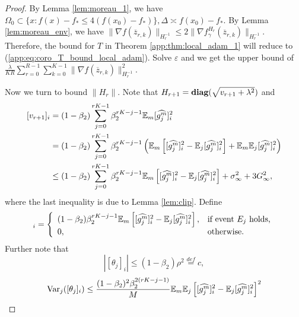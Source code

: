 \documentclass{article} %
\numberwithin{equation}{section}
\renewcommand{\eqref}[1]{(\ref{#1})}
\begin{document}
\begin{proof}
    By Lemma \ref{lem:moreau_1}, we have $\Omega_0\subset \{x: f(x)-f_*\leq 4(f(x_0)-f_*)\}, \Delta\asymp f(x_0)-f_*$.
    By Lemma \ref{lem:moreau_env}, we have $\|\nabla f(\overline{z}_{r,k})\|_{H_r^{-1}}\leq 2\|\nabla f_\gamma^{H_r}(\overline{z}_{r,k})\|_{H_r^{-1}}$. 
    Therefore, the bound for $T$ in Theorem \ref{app:thm:local_adam_1} will reduce to \eqref{app:eq:coro_T_bound_local_adam}. Solve $\varepsilon$ and we get the upper bound of $\frac{\lambda}{KR}\sum_{r=0}^{R-1}\sum_{k=0}^{K-1}\|\nabla f(\overline{z}_{r,k}) \|_{H_r^{-1}}^2$.

    Now we turn to bound $\|H_r\|$. Note that $H_{r+1}=\mbox{\bf diag}(\sqrt{v_{r+1}+\lambda^2})$ and 
    \begin{equation}
        \begin{aligned}
            \relax[v_{r+1}]_i
            &=(1-\beta_2)\sum_{j=0}^{rK-1}\beta_2^{rK-j-1}\mathbb{E}_m[\widehat{g_j^m}]_i^2 \\
            &= (1-\beta_2)\sum_{j=0}^{rK-1}\beta_2^{rK-j-1}\left(\mathbb{E}_m\left[[\widehat{g_j^m}]_i^2-\mathbb{E}_j[\widehat{g_j^m}]_i^2\right] + \mathbb{E}_m\mathbb{E}_j[\widehat{g_j^m}]_i^2\right) \\
            &\leq (1-\beta_2)\sum_{j=0}^{rK-1}\beta_2^{rK-j-1}\mathbb{E}_m\left[[\widehat{g_j^m}]_i^2-\mathbb{E}_j[\widehat{g_j^m}]_i^2\right] + \sigma_\infty^2 + 3G_\infty^2,
        \end{aligned}
    \end{equation}
    where the last inequality is due to Lemma \ref{lem:clip}.
    Define 
    \begin{equation}
        [\theta_j]_i = \left\{
            \begin{array}{ll}
                (1-\beta_2)\beta_2^{rK-j-1}\expect_m\left[[\widehat{g_j^m}]_i^2 - \expect_j[\widehat{g_j^m}]_i^2\right], & \text{if event $E_j$ holds,} \\
                0, & \text{otherwise}.
            \end{array}
        \right.
    \end{equation}
    Further note that
    \begin{equation}
        |[\theta_j]_i| \leq (1-\beta_2)\rho^2 \overset{def}{=}c,
    \end{equation}
    \begin{equation}
        \begin{aligned}
            \Var_j([\theta_j]_i) 
            &\leq \frac{(1-\beta_2)^2\beta_2^{2(rK-j-1)}}{M}\expect_m\expect_j \left[[\widehat{g_j^m}]_i^2 - \expect_j[\widehat{g_j^m}]_i^2\right]^2 \\

\end{aligned}
\end{equation}
\end{proof}
\end{document}
